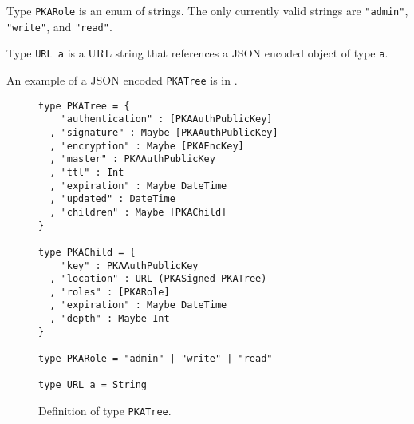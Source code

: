 \documentclass{article}
\newcommand{\jp}[1]{\textcolor{blue}{JP: #1}}
\begin{document}


Type \texttt{PKARole} is an enum of strings. 
The only currently valid strings are \texttt{"admin"}, \texttt{"write"}, and \texttt{"read"}. %

Type \texttt{URL a} is a URL string that references a JSON encoded object of type \texttt{a}. 

%

An example of a JSON encoded \texttt{PKATree} is in . 

\begin{figure}[h!]
\begin{lstlisting}
type PKATree = {
    "authentication" : [PKAAuthPublicKey]
  , "signature" : Maybe [PKAAuthPublicKey]
  , "encryption" : Maybe [PKAEncKey]
  , "master" : PKAAuthPublicKey
  , "ttl" : Int
  , "expiration" : Maybe DateTime
  , "updated" : DateTime
  , "children" : Maybe [PKAChild]
}

type PKAChild = {
    "key" : PKAAuthPublicKey
  , "location" : URL (PKASigned PKATree)
  , "roles" : [PKARole]
  , "expiration" : Maybe DateTime
  , "depth" : Maybe Int
}

type PKARole = "admin" | "write" | "read"

type URL a = String
\end{lstlisting}
\caption{Definition of type \texttt{PKATree}.}
\label{code:pkatree}
\end{figure}


\end{document}
